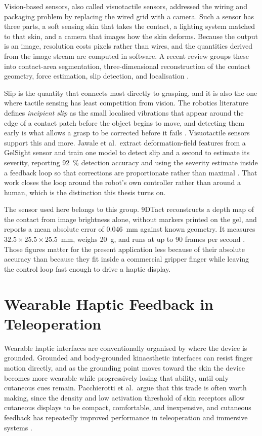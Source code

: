 \documentclass[12pt, a4paper, twoside, openright]{report}
\begin{document}
Vision-based sensors, also called visuotactile sensors, addressed the wiring
and packaging problem by replacing the wired grid with a camera. Such a sensor
has three parts, a soft sensing skin that takes the contact, a lighting system
matched to that skin, and a camera that images how the skin deforms. Because
the output is an image, resolution costs pixels rather than wires, and the
quantities derived from the image stream are computed in software. A recent
review groups these into contact-area segmentation, three-dimensional
reconstruction of the contact geometry, force estimation, slip detection, and
localisation \cite{li2024}.

Slip is the quantity that connects most directly to grasping, and it is also
the one where tactile sensing has least competition from vision. The robotics
literature defines \emph{incipient slip} as the small localised vibrations that
appear around the edge of a contact patch before the object begins to move, and
detecting them early is what allows a grasp to be corrected before it fails
\cite{cutkosky2016}. Visuotactile sensors support this and more. Jawale et al.\
extract deformation-field features from a GelSight sensor and train one model
to detect slip and a second to estimate its severity, reporting \SI{92}{\percent}
detection accuracy and using the severity estimate inside a feedback loop so
that corrections are proportionate rather than maximal \cite{jawale2024}. That
work closes the loop around the robot's own controller rather than around a
human, which is the distinction this thesis turns on.

The sensor used here belongs to this group. 9DTact reconstructs a depth map of
the contact from image brightness alone, without markers printed on the gel,
and reports a mean absolute error of \SI{0.046}{\milli\metre} against known
geometry. It measures $32.5 \times 25.5 \times 25.5$~\si{\milli\metre}, weighs
\SI{20}{\gram}, and runs at up to 90 frames per second \cite{lin2023}. Those
figures matter for the present application less because of their absolute
accuracy than because they fit inside a commercial gripper finger while
leaving the control loop fast enough to drive a haptic display.

\section{Wearable Haptic Feedback in Teleoperation}
\label{sec:lit-haptics}

Wearable haptic interfaces are conventionally organised by where the device is
grounded. Grounded and body-grounded kinaesthetic interfaces can resist finger
motion directly, and as the grounding point moves toward the skin the device
becomes more wearable while progressively losing that ability, until only
cutaneous cues remain. Pacchierotti et al.\ argue that this trade is often
worth making, since the density and low activation threshold of skin receptors
allow cutaneous displays to be compact, comfortable, and inexpensive, and
cutaneous feedback has repeatedly improved performance in teleoperation and
immersive systems \cite{pacchierotti2017}.
\end{document}
